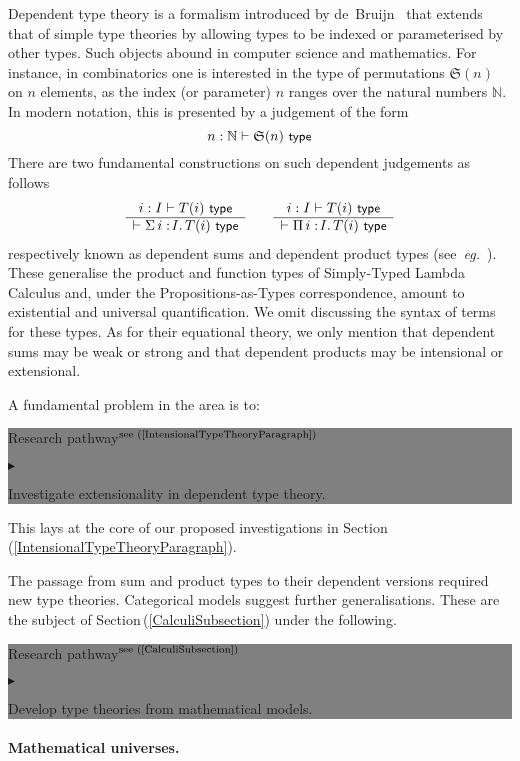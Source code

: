 \documentclass[11pt,twocolumn]{article}
\newenvironment{btritemize}
  {\begin{list}{\btr}
  {\setlength{\topsep}{2pt}
   \setlength{\partopsep}{2pt}
   \setlength{\itemsep}{2.5pt}
   \setlength{\parsep}{2.5pt}
   \setlength{\leftmargin}{1em}
   \setlength{\labelwidth}{.5em}}}
  {\end{list}}
\newcommand{\mysf}{\small\sf}
\newcommand{\mytextsf}[1]{\textsf{\small #1}}
\newcommand{\pref}[1]{\,(\ref{#1})}
\newcommand{\eg}{\emph{eg.}}
\newcommand{\btr}{$\blacktriangleright$}
\newcommand{\reqpsize}{8.113395cm}%
\newcommand{\rep}[2]{\begin{center}\colorbox{grey}{\begin{minipage}{\reqpsize}
  \mytextsf{Research pathway}\hfill$^{\mbox{\scriptsize see #1 }}$\\[-5.5mm]
  \begin{btritemize}
  \item #2
  \end{btritemize}
\end{minipage}}\end{center}}
\begin{document}
Dependent type theory is a formalism introduced by
de~Bruijn~\cite{deBruijn} that extends that of simple type theories by
allowing types to be indexed or parameterised by other types.  Such
objects abound in computer science and mathematics.  For instance, in
combinatorics one is interested in the type of permutations $\mathfrak
S(n)$ on $n$ elements, as the index (or parameter) $n$ ranges over the
natural numbers $\mathbb N$.  In modern notation, this is presented by a
judgement of the form
\[
  n:\mathbb N \vdash \mathfrak S(n) \mbox{ \mysf type}
\]
There are two fundamental constructions on such dependent judgements as
follows
\[
  \begin{array}{c}
  i: I \vdash T(i) \mbox{ \mysf type}
  \\ \hline
  \vdash \Sigma\,{i:\!I}.\, T(i) \mbox{ \mysf type}
  \end{array}
  \qquad
  \begin{array}{c}
  i: I \vdash T(i) \mbox{ \mysf type}
  \\ \hline
  \vdash \Pi\,{i:\!I}.\, T(i) \mbox{ \mysf type}
  \end{array}
\]
respectively known as dependent sums and dependent product types
(see~\eg~\cite{Jacobs}).  These generalise the product and function types of
Simply-Typed Lambda Calculus and, under the Propositions-as-Types
correspondence, amount to existential and universal quantification.  We omit
discussing the syntax of terms for these types.  As for their equational
theory, we only mention that dependent sums may be weak or strong and that
dependent products may be intensional or extensional.

A fundamental problem in the area is to:
\rep{(\ref{IntensionalTypeTheoryParagraph})}
  {Investigate extensionality in dependent type theory.}
This lays at the core of our proposed investigations in
Section\pref{IntensionalTypeTheoryParagraph}.

The passage from sum and product types to their dependent versions
required new type theories.  Categorical models suggest further
generalisations.  These are the subject of
Section\pref{CalculiSubsection}
under the following. 
\rep{(\ref{CalculiSubsection})}
  {Develop type theories from mathematical models.}

\paragraph{Mathematical universes.}
\label{MathematicalUniversesParagraph}
\end{document}
